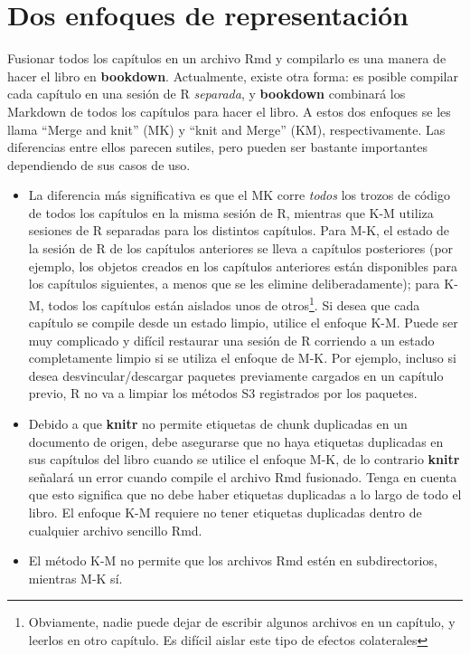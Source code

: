 \documentclass[12pt,]{krantz}
\providecommand{\tightlist}{%
  \setlength{\itemsep}{0pt}\setlength{\parskip}{0pt}}
\theoremstyle{definition}
\theoremstyle{definition}
\theoremstyle{definition}
\theoremstyle{remark}
\begin{document}
\section{Dos enfoques de representación}\label{new-session}

Fusionar todos los capítulos en un archivo Rmd y compilarlo es una
manera de hacer el libro en \textbf{bookdown}. Actualmente, existe otra
forma: es posible compilar cada capítulo en una sesión de R
\emph{separada}, y \textbf{bookdown} combinará los Markdown de todos los
capítulos para hacer el libro. A estos dos enfoques se les llama ``Merge
and knit'' (MK) y ``knit and Merge'' (KM), respectivamente. Las
diferencias entre ellos parecen sutiles, pero pueden ser bastante
importantes dependiendo de sus casos de uso.

\begin{itemize}
\tightlist
\item
  La diferencia más significativa es que el MK corre \emph{todos} los
  trozos de código de todos los capítulos en la misma sesión de R,
  mientras que K-M utiliza sesiones de R separadas para los distintos
  capítulos. Para M-K, el estado de la sesión de R de los capítulos
  anteriores se lleva a capítulos posteriores (por ejemplo, los objetos
  creados en los capítulos anteriores están disponibles para los
  capítulos siguientes, a menos que se les elimine deliberadamente);
  para K-M, todos los capítulos están aislados unos de otros\footnote{Obviamente,
    nadie puede dejar de escribir algunos archivos en un capítulo, y
    leerlos en otro capítulo. Es difícil aislar este tipo de efectos
    colaterales}. Si desea que cada capítulo se compile desde un estado
  limpio, utilice el enfoque K-M. Puede ser muy complicado y difícil
  restaurar una sesión de R corriendo a un estado completamente limpio
  si se utiliza el enfoque de M-K. Por ejemplo, incluso si desea
  desvincular/descargar paquetes previamente cargados en un capítulo
  previo, R no va a limpiar los métodos S3 registrados por los paquetes.
\item
  Debido a que \textbf{knitr} no permite etiquetas de chunk duplicadas
  en un documento de origen, debe asegurarse que no haya etiquetas
  duplicadas en sus capítulos del libro cuando se utilice el enfoque
  M-K, de lo contrario \textbf{knitr} señalará un error cuando compile
  el archivo Rmd fusionado. Tenga en cuenta que esto significa que no
  debe haber etiquetas duplicadas a lo largo de todo el libro. El
  enfoque K-M requiere no tener etiquetas duplicadas dentro de cualquier
  archivo sencillo Rmd.
\item
  El método K-M no permite que los archivos Rmd estén en subdirectorios,
  mientras M-K sí.
\end{itemize}
\end{document}
